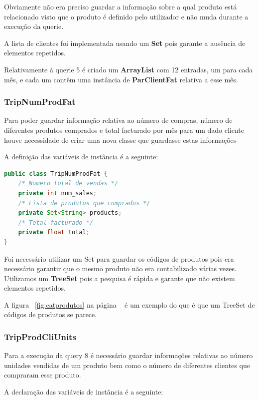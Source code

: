 \documentclass[10pt] {article}
\begin{document}
\par Obviamente não era preciso guardar a informação sobre a qual produto está relacionado visto que o produto é definido
pelo utilizador e não muda durante a execução da querie.
\par A lista de clientes foi implementada usando um \textbf{Set} pois garante a ausência de elementos repetidos.
\par Relativamente à querie 5 é criado um \textbf{ArrayList} com 12 entradas, um para cada mês, e cada um contêm uma
instância de \textbf{ParClientFat} relativa a esse mês.

\subsubsection{TripNumProdFat}
\par Para poder guardar informação relativa ao número de compras, número de diferentes produtos comprados e total
facturado por mês para um dado cliente houve necessidade de criar uma nova classe que guardasse estas informações-
\par A definição das variáveis de instância é a seguinte:

\begin{lstlisting}[language=Java]
public class TripNumProdFat {
	/* Numero total de vendas */
	private int num_sales;
	/* Lista de produtos que comprados */
	private Set<String> products;
	/* Total facturado */
	private float total;
}
\end{lstlisting}

\par Foi necessário utilizar um Set para guardar os códigos de produtos pois era necessário garantir que o mesmo produto
não era contabilizado várias vezes. Utilizamos um \textbf{TreeSet} pois a pesquisa é rápida e garante que não existem
elementos repetidos.
\par A figura ~\ref{fig:catprodutos} na página ~\pageref{fig:catprodutos} é um exemplo do que é que um TreeSet de
códigos de produtos se parece.

\subsubsection{TripProdCliUnits}
\par Para a execução da query 8 é necessário guardar informações relativas ao número unidades vendidas de um produto
bem como o número de diferentes clientes que compraram esse produto.
\par A declaração das variáveis de instância é a seguinte:
\end{document}
